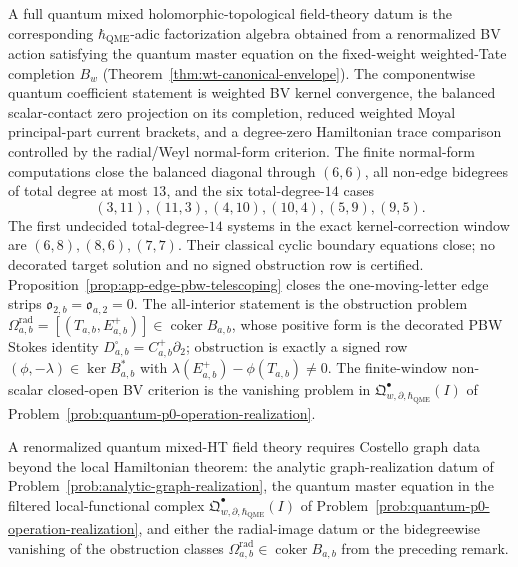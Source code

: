\documentclass[11pt]{memoir}
\begin{document}
\begin{rmk}
  A full quantum mixed holomorphic-topological field-theory datum is the
  corresponding \(\hbar_{\mathrm{QME}}\)-adic factorization algebra obtained from a
  renormalized BV action satisfying the quantum master equation on
  the fixed-weight weighted-Tate completion \(B_w\)
  (Theorem~\ref{thm:wt-canonical-envelope}).  The componentwise quantum
  coefficient statement is weighted BV kernel convergence, the
  balanced scalar-contact zero projection on its completion, reduced
  weighted Moyal principal-part current brackets, and a degree-zero
  Hamiltonian trace comparison controlled by the radial/Weyl
  normal-form criterion.  The finite normal-form computations close
  the balanced diagonal through \((6,6)\), all non-edge bidegrees of
  total degree at most \(13\), and the six total-degree-\(14\)
  cases
  \[
    (3,11),(11,3),(4,10),(10,4),(5,9),(9,5).
  \]
  The first undecided total-degree-\(14\) systems in the exact
  kernel-correction window are \((6,8),(8,6),(7,7)\).  Their
  classical cyclic boundary equations close; no decorated target
  solution and no signed obstruction row is certified.
  Proposition~\ref{prop:app-edge-pbw-telescoping} closes the
  one-moving-letter edge strips
  \(\mathfrak o_{2,b}=\mathfrak o_{a,2}=0\).  The all-interior
  statement is the obstruction problem
  \(\Omega^{\mathrm{rad}}_{a,b}
   =[(T_{a,b},E^+_{a,b})]\in\operatorname{coker}B_{a,b}\),
  whose positive form is the decorated PBW Stokes identity
  \(D^\square_{a,b}=C^+_{a,b}\partial_2\); obstruction is exactly a signed
  row \((\phi,-\lambda)\in\ker B_{a,b}^*\) with
  \(\lambda(E^+_{a,b})-\phi(T_{a,b})\ne0\).  The finite-window
  non-scalar closed-open BV criterion is the vanishing problem in
  \(\mathfrak Q^\bullet_{w,\partial,\hbar_{\mathrm{QME}}}(I)\) of
  Problem~\ref{prob:quantum-p0-operation-realization}.
\end{rmk}

A renormalized quantum mixed-HT field theory requires Costello graph
data beyond the local Hamiltonian theorem: the analytic
graph-realization datum of
Problem~\ref{prob:analytic-graph-realization}, the quantum master
equation in the filtered local-functional complex
\(\mathfrak Q^\bullet_{w,\partial,\hbar_{\mathrm{QME}}}(I)\) of
Problem~\ref{prob:quantum-p0-operation-realization}, and either the
radial-image datum or the bidegreewise vanishing of the obstruction
classes \(\Omega^{\mathrm{rad}}_{a,b}\in\operatorname{coker}B_{a,b}\)
from the preceding remark.
\end{document}
